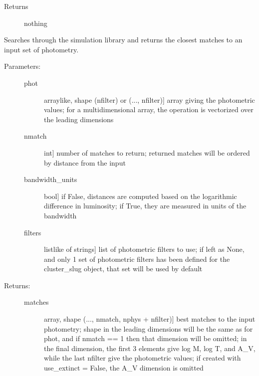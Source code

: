 \documentclass[letterpaper,10pt,english]{sphinxmanual}
\begin{document}
\begin{fulllineitems}
\begin{fulllineitems}
\begin{description}
\begin{description}
\end{description}

\item[{Returns}] \leavevmode
nothing

\end{description}

\end{fulllineitems}


\begin{fulllineitems}
\label{cluster_slug:slugpy.cluster_slug.cluster_slug.bestmatch}
Searches through the simulation library and returns the closest
matches to an input set of photometry.
\begin{description}
\item[{Parameters:}] \leavevmode\begin{description}
\item[{phot}] \leavevmode{[}arraylike, shape (nfilter) or (..., nfilter){]}
array giving the photometric values; for a
multidimensional array, the operation is vectorized over
the leading dimensions

\item[{nmatch}] \leavevmode{[}int{]}
number of matches to return; returned matches will be
ordered by distance from the input

\item[{bandwidth\_units}] \leavevmode{[}bool{]}
if False, distances are computed based on the
logarithmic difference in luminosity; if True, they are
measured in units of the bandwidth

\item[{filters}] \leavevmode{[}listlike of strings{]}
list of photometric filters to use; if left as None, and
only 1 set of photometric filters has been defined for
the cluster\_slug object, that set will be used by
default

\end{description}

\item[{Returns:}] \leavevmode\begin{description}
\item[{matches}] \leavevmode{[}array, shape (..., nmatch, nphys + nfilter){]}
best matches to the input photometry; shape in the
leading dimensions will be the same as for phot, and if
nmatch == 1 then that dimension will be omitted; in the
final dimension, the first 3 elements give log M, log T,
and A\_V, while the last nfilter give the photometric
values; if created with use\_extinct = False, the A\_V
dimension is omitted


\end{description}
\end{description}
\end{fulllineitems}
\end{fulllineitems}
\end{document}
